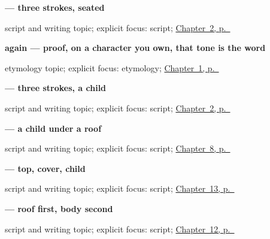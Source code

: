 \noindent\begin{minipage}[t]{\linewidth}
\raggedright
\textbf{ — three strokes, seated}\par
\footnotesize script and writing topic; explicit focus: script; \hyperref[ch:zh-components]{Chapter~2, p.~\pageref*{ch:zh-components}}
\end{minipage}\par\smallskip

\noindent\begin{minipage}[t]{\linewidth}
\raggedright
\textbf{ again — proof, on a character you own, that tone is the word}\par
\footnotesize etymology topic; explicit focus: etymology; \hyperref[ch:zh-nihao]{Chapter~1, p.~\pageref*{ch:zh-nihao}}
\end{minipage}\par\smallskip

\noindent\begin{minipage}[t]{\linewidth}
\raggedright
\textbf{ — three strokes, a child}\par
\footnotesize script and writing topic; explicit focus: script; \hyperref[ch:zh-components]{Chapter~2, p.~\pageref*{ch:zh-components}}
\end{minipage}\par\smallskip

\noindent\begin{minipage}[t]{\linewidth}
\raggedright
\textbf{ — a child under a roof}\par
\footnotesize script and writing topic; explicit focus: script; \hyperref[ch:zh-mingzi]{Chapter~8, p.~\pageref*{ch:zh-mingzi}}
\end{minipage}\par\smallskip

\noindent\begin{minipage}[t]{\linewidth}
\raggedright
\textbf{ — top, cover, child}\par
\footnotesize script and writing topic; explicit focus: script; \hyperref[ch:zh-school-six]{Chapter~13, p.~\pageref*{ch:zh-school-six}}
\end{minipage}\par\smallskip

\noindent\begin{minipage}[t]{\linewidth}
\raggedright
\textbf{ — roof first, body second}\par
\footnotesize script and writing topic; explicit focus: script; \hyperref[ch:zh-family-six]{Chapter~12, p.~\pageref*{ch:zh-family-six}}
\end{minipage}\par\smallskip

